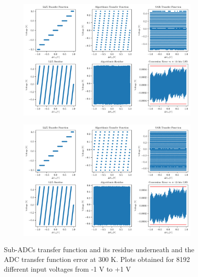 \begin{figure}[htp]
	\centering
	\begin{subfigure}[b]{0.9\textwidth}
		\centering
		\includegraphics[width=\textwidth]{Chapter4/Figs/results/algo_feedback/adc-osr5-70db-750MHz-fb1.pdf}
	\end{subfigure}
	\begin{subfigure}[b]{0.9\textwidth}
		\centering
		\includegraphics[width=\textwidth]{Chapter4/Figs/results/algo_feedback/adc-osr5-70db-750MHz-fb12.pdf}
	\end{subfigure}
	\caption{Sub-ADCs transfer function and its residue underneath and the ADC transfer function error at 300 K. Plots obtained for 8192 different input voltages from -1 V to +1 V}
	\label{fig:algorithmic-feedback-impact}
\end{figure}

